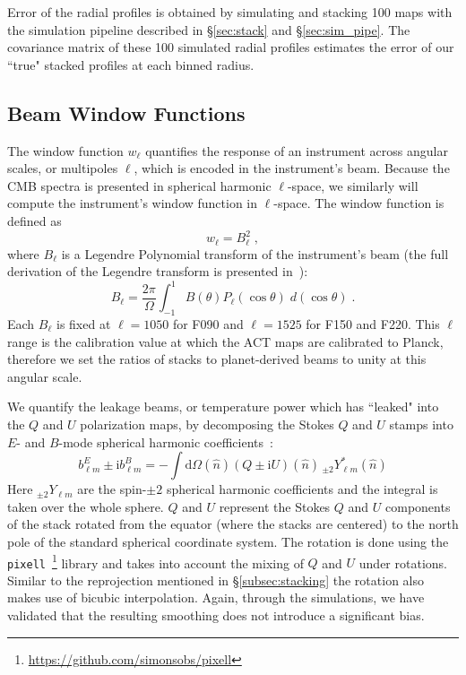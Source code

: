 Error of the radial profiles is obtained by simulating and stacking 100 maps with the simulation pipeline described in \S\ref{sec:stack} and \S\ref{sec:sim_pipe}.  The covariance matrix of these 100 simulated radial profiles estimates the error of our ``true" stacked profiles at each binned radius.

\subsection{Beam Window Functions}
\label{subsec:window}
The window function $w_{\ell}$ quantifies the response of an instrument across angular scales, or multipoles $\ell$, which is encoded in the instrument's beam.  Because the CMB spectra is presented in spherical harmonic $\ell$-space, we similarly will compute the instrument's window function in $\ell$-space.  The window function is defined as
\begin{equation}
    w_\ell = B_\ell^2 \; ,
\end{equation}
where $B_\ell$ is a Legendre Polynomial transform of the instrument's beam (the full derivation of the Legendre transform is presented in~\cite{Lungu_2022}): 
\begin{equation}
B_{\ell} = \frac{2\pi}{\Omega}\int_{-1}^{1} B(\theta)P_{\ell}(\cos\theta)\; d(\cos\theta) \; .
\label{eq:legendre}
\end{equation}
Each $B_\ell$ is fixed at $\ell=1050$ for F090 and $\ell=1525$ for F150 and F220.  This $\ell$ range is the calibration value at which the ACT maps are calibrated to Planck, therefore we set the ratios of stacks to planet-derived beams to unity at this angular scale.

We quantify the leakage beams, or temperature power which has ``leaked" into the $Q$ and $U$ polarization maps, by decomposing the Stokes $Q$ and $U$ stamps into $E$- and $B$-mode spherical harmonic coefficients~\cite{challinor_2000}:
\begin{equation}
\label{eq:pol_beam_coeffs}
b^{E}_{\ell m} \pm \mathrm{i} b^{B}_{\ell m} = - \int \mathrm{d}\Omega(\hat{n}) (Q \pm \mathrm{i} U)(\hat{n})\, {}_{\pm 2}Y^*_{\ell m}(\hat{n})
\end{equation}
Here ${}_{\pm 2}Y_{\ell m}$ are the spin-$\pm2$ spherical harmonic coefficients and the integral is taken over the whole sphere.  $Q$ and $U$ represent the Stokes $Q$ and $U$ components of the stack rotated from the equator (where the stacks are centered) to the north pole of the standard spherical coordinate system. The rotation is done using the \texttt{pixell}~\footnote{\url{https://github.com/simonsobs/pixell}} library and takes into account the mixing of $Q$ and $U$ under rotations.  Similar to the reprojection mentioned in \S\ref{subsec:stacking} the rotation also makes use of bicubic interpolation. Again, through the simulations, we have validated that the resulting smoothing does not introduce a significant bias.

